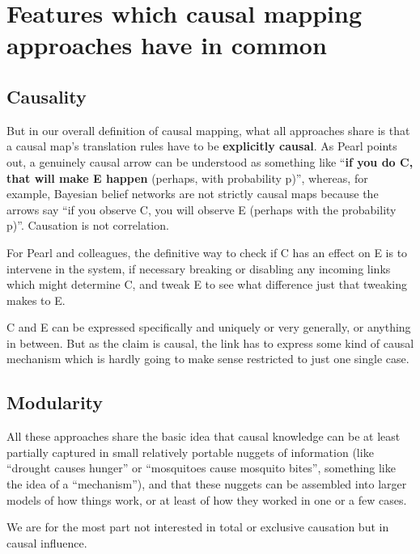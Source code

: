 \documentclass[
]{book}
\begin{document}
\hypertarget{features-which-causal-mapping-approaches-have-in-common}{%
\section{Features which causal mapping approaches have in common}\label{features-which-causal-mapping-approaches-have-in-common}}

\hypertarget{causality}{%
\subsection{Causality}\label{causality}}

But in our overall definition of causal mapping, what all approaches share is that a causal map's translation rules have to be \textbf{explicitly causal}. As Pearl points out, a genuinely causal arrow can be understood as something like ``\textbf{if you do C, that will make E happen} (perhaps, with probability p)'', whereas, for example, Bayesian belief networks are not strictly causal maps because the arrows say ``if you observe C, you will observe E (perhaps with the probability p)''. Causation is not correlation.

For Pearl and colleagues, the definitive way to check if C has an effect on E is to intervene in the system, if necessary breaking or disabling any incoming links which might determine C, and tweak E to see what difference just that tweaking makes to E.

C and E can be expressed specifically and uniquely or very generally, or anything in between. But as the claim is causal, the link has to express some kind of causal mechanism which is hardly going to make sense restricted to just one single case.

\hypertarget{modularity}{%
\subsection{Modularity}\label{modularity}}

All these approaches share the basic idea that causal knowledge can be at least partially captured in small relatively portable nuggets of information (like ``drought causes hunger'' or ``mosquitoes cause mosquito bites'', something like the idea of a ``mechanism''), and that these nuggets can be assembled into larger models of how things work, or at least of how they worked in one or a few cases.

We are for the most part not interested in total or exclusive causation but in causal influence.
\end{document}
